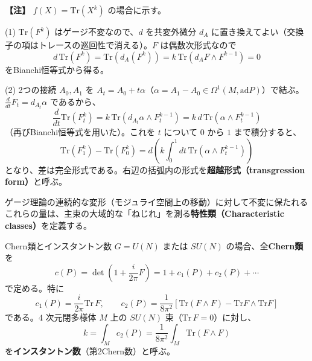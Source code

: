 \documentclass[uplatex, dvipdfmx, book]{jsbook}
\newenvironment{note}{\vspace{1ex}\par\footnotesize\noindent\textbf{【注】}}{\par\vspace{1ex}}
\begin{document}
\begin{note}
$f(X) = \mathrm{Tr}(X^k)$ の場合に示す。

(1) $\mathrm{Tr}(F^k)$ はゲージ不変なので、$d$ を共変外微分 $d_A$ に置き換えてよい（交換子の項はトレースの巡回性で消える）。$F$ は偶数次形式なので
\begin{equation*}
    d\,\mathrm{Tr}(F^k) = \mathrm{Tr}(d_A(F^k)) = k\, \mathrm{Tr}(d_A F \wedge F^{k-1}) = 0
\end{equation*}
をBianchi恒等式から得る。

(2) 2つの接続 $A_0, A_1$ を $A_t = A_0 + t\alpha$（$\alpha = A_1 - A_0 \in \Omega^1(M, \mathrm{ad}P)$）で結ぶ。$\frac{d}{dt}F_t = d_{A_t}\alpha$ であるから、
\begin{equation*}
    \frac{d}{dt}\mathrm{Tr}(F_t^k) = k\,\mathrm{Tr}(d_{A_t}\alpha \wedge F_t^{k-1}) = k\, d\,\mathrm{Tr}(\alpha \wedge F_t^{k-1})
\end{equation*}
（再びBianchi恒等式を用いた）。これを $t$ について $0$ から $1$ まで積分すると、
\begin{equation*}
    \mathrm{Tr}(F_1^k) - \mathrm{Tr}(F_0^k) = d\left( k \int_0^1 dt\, \mathrm{Tr}(\alpha \wedge F_t^{k-1}) \right)
\end{equation*}
となり、差は完全形式である。右辺の括弧内の形式を\textbf{超越形式（transgression form）}と呼ぶ。
\end{note}

ゲージ理論の連続的な変形（モジュライ空間上の移動）に対して不変に保たれるこれらの量は、主束の大域的な「ねじれ」を測る\textbf{特性類（Characteristic classes）}を定義する。

\begin{mydef}{Chern類とインスタントン数}{}
$G = U(N)$ または $SU(N)$ の場合、全\textbf{Chern類}を
\begin{equation*}
    c(P) = \det\left( 1 + \frac{i}{2\pi} F \right) = 1 + c_1(P) + c_2(P) + \cdots
\end{equation*}
で定める。特に
\begin{equation*}
    c_1(P) = \frac{i}{2\pi}\mathrm{Tr}\, F, \qquad c_2(P) = \frac{1}{8\pi^2}\left[ \mathrm{Tr}(F \wedge F) - \mathrm{Tr}F \wedge \mathrm{Tr}F \right]
\end{equation*}
である。$4$ 次元閉多様体 $M$ 上の $SU(N)$ 束（$\mathrm{Tr}\, F = 0$）に対し、
\begin{equation*}
    k = \int_M c_2(P) = \frac{1}{8\pi^2} \int_M \mathrm{Tr}(F \wedge F)
\end{equation*}
を\textbf{インスタントン数}（第2Chern数）と呼ぶ。
\end{mydef}
\end{document}
